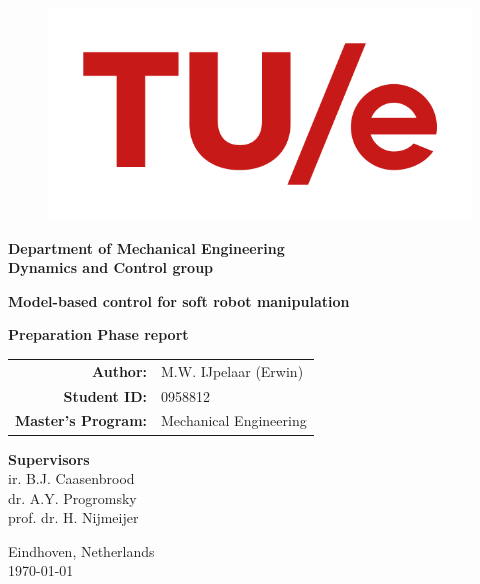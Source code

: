 
\begin{titlepage}

          \begin{figure}[H]
                \centering
              \includegraphics[width=0.6\linewidth]{TitlePage/tue.png}
          \end{figure}

\begin{center}
\vspace*{5mm}


\large
    \textbf{Department of Mechanical Engineering} \\
    \textbf{Dynamics and Control group}

\vspace*{10mm}

    \huge
    \textbf{Model-based control for soft robot manipulation\\}
    
\vspace{15mm}
    \Large \textbf{Preparation Phase report} \\
    
\vspace*{2.6cm}
    
    \large
    \begin{tabular}{rl}
    \textbf{Author:}           & M.W. IJpelaar (Erwin)  \\
    \textbf{Student ID:}       & 0958812  \\
    \textbf{Master's Program:} & Mechanical Engineering \\
    \end{tabular}

\vspace*{15mm}


        
    \large
 \textbf{Supervisors}   \\
    ir. B.J. Caasenbrood   \\
    dr. A.Y. Progromsky  \\
    prof. dr. H. Nijmeijer   \\



    \vspace*{2cm}
     \vspace{0.6cm}


	\begin{flushright}
		Eindhoven, Netherlands\\
		\today \\	
	\end{flushright}
	
\end{center}	
\end{titlepage}